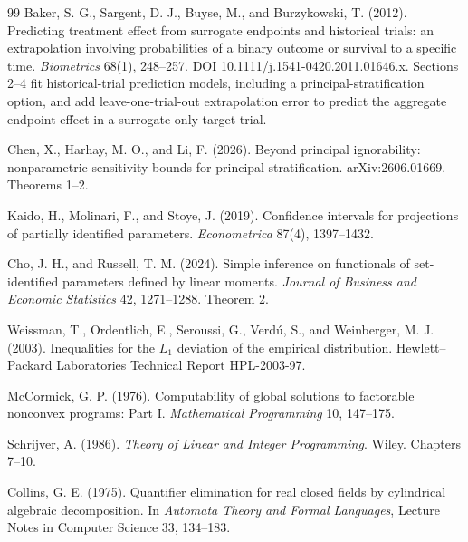 \documentclass{article}
\begin{document}
\begin{thebibliography}{99}
   Baker, S. G., Sargent, D. J., Buyse, M., and Burzykowski, T. (2012). Predicting treatment effect from surrogate endpoints and historical trials: an extrapolation involving probabilities of a binary outcome or survival to a specific time. \emph{Biometrics} 68(1), 248--257. DOI 10.1111/j.1541-0420.2011.01646.x. Sections 2--4 fit historical-trial prediction models, including a principal-stratification option, and add leave-one-trial-out extrapolation error to predict the aggregate endpoint effect in a surrogate-only target trial.

   Chen, X., Harhay, M. O., and Li, F. (2026). Beyond principal ignorability: nonparametric sensitivity bounds for principal stratification. arXiv:2606.01669. Theorems 1--2.

   Kaido, H., Molinari, F., and Stoye, J. (2019). Confidence intervals for projections of partially identified parameters. \emph{Econometrica} 87(4), 1397--1432.

   Cho, J. H., and Russell, T. M. (2024). Simple inference on functionals of set-identified parameters defined by linear moments. \emph{Journal of Business and Economic Statistics} 42, 1271--1288. Theorem 2.

   Weissman, T., Ordentlich, E., Seroussi, G., Verd\'u, S., and Weinberger, M. J. (2003). Inequalities for the \(L_1\) deviation of the empirical distribution. Hewlett--Packard Laboratories Technical Report HPL-2003-97.

   McCormick, G. P. (1976). Computability of global solutions to factorable nonconvex programs: Part I. \emph{Mathematical Programming} 10, 147--175.

   Schrijver, A. (1986). \emph{Theory of Linear and Integer Programming}. Wiley. Chapters 7--10.

   Collins, G. E. (1975). Quantifier elimination for real closed fields by cylindrical algebraic decomposition. In \emph{Automata Theory and Formal Languages}, Lecture Notes in Computer Science 33, 134--183.

\end{thebibliography}
\end{document}
